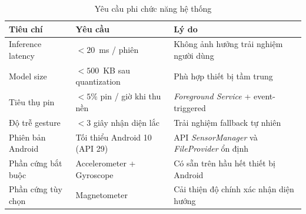\documentclass[../DoAn.tex]{subfiles}
\begin{document}
    \begin{table}[H]
    \centering
    \caption{Yêu cầu phi chức năng hệ thống}
    \label{tab:non_functional_requirements}
    \renewcommand{\arraystretch}{1.4}
    
    \begin{tabular}{|p{4cm}|p{5cm}|p{5cm}|}
    \hline
    \textbf{Tiêu chí} & \textbf{Yêu cầu} & \textbf{Lý do} \\
    \hline
    
    Inference latency 
    & $< 20$~ms / phiên 
    & Không ảnh hưởng trải nghiệm người dùng \\
    \hline
    
    Model size 
    & $< 500$~KB sau quantization 
    & Phù hợp thiết bị tầm trung \\
    \hline
    
    Tiêu thụ pin 
    & $< 5\%$ pin / giờ khi thu nền 
    & \textit{Foreground Service} + event-triggered \\
    \hline
    
    Độ trễ gesture 
    & $< 3$ giây nhận diện lắc 
    & Trải nghiệm fallback tự nhiên \\
    \hline
    
    Phiên bản Android 
    & Tối thiểu Android 10 (API 29) 
    & API \textit{SensorManager} và \textit{FileProvider} ổn định \\
    \hline
    
    Phần cứng bắt buộc 
    & Accelerometer + Gyroscope 
    & Có sẵn trên hầu hết thiết bị Android \\
    \hline
    
    Phần cứng tùy chọn 
    & Magnetometer 
    & Cải thiện độ chính xác nhận diện hướng \\
    \hline
    
    \end{tabular}
    \end{table}
    
\end{document}
